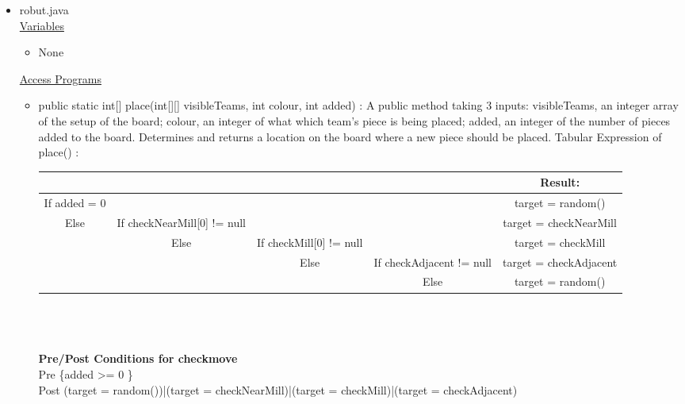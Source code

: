 \documentclass[12pt]{article}
\begin{document}
\begin{itemize}
	\item robut.java \\
	\underline{Variables}
	\begin{itemize}
		\item None
	\end{itemize}
	\underline{Access Programs}
	\begin{itemize}
		\item public static int[] place(int[][] visibleTeams, int colour, int added) : A public method taking 3 inputs: visibleTeams, an integer array of the setup of the board; colour, an integer of what which team’s piece is being placed; added, an integer of the number of pieces added to the board. Determines and returns a location on the board where a new piece should be placed. \newpage
		Tabular Expression of place() : \\
		\begin{tabularx}{\linewidth}{|C|C|C|C|C|}
			\hline
			&&&& Result: \\ \hline
			If added = 0 &&&&target = random() \\ \hline 
			Else & If checkNearMill[0] != null&&& target = checkNearMill \\ \hline 
			& Else & If checkMill[0] != null&& target = checkMill \\ \hline 
			&& Else & If checkAdjacent != null & target = checkAdjacent \\ \hline
			&&& Else & target = random() \\ \hline
		\end{tabularx} \\ \\ \\
		\textbf{Pre/Post Conditions for checkmove} \\
		Pre \{added >= 0 \} \\
		Post (target = random())|(target = checkNearMill)|(target = checkMill)|(target = checkAdjacent)\\
		

\end{itemize}
\end{itemize}
\end{document}

